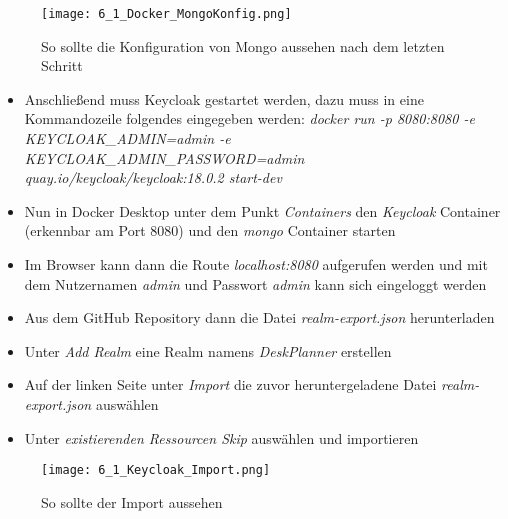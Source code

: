 \begin{figure}[!h]
    \centering
    \texttt{[image: 6\_1\_Docker\_MongoKonfig.png]}
    \caption{So sollte die Konfiguration von Mongo aussehen nach dem letzten Schritt}
    \label{fig:DockerMongoKonfig}
\end{figure}

\begin{itemize}
    \item   Anschließend muss Keycloak gestartet werden, dazu muss in eine Kommandozeile folgendes eingegeben werden: \textit{docker run -p 8080:8080 -e KEYCLOAK\_ADMIN=admin -e KEYCLOAK\_ADMIN\_PASSWORD=admin quay.io/keycloak/keycloak:18.0.2 start-dev}
    \item   Nun in Docker Desktop unter dem Punkt \textit{Containers} den \textit{Keycloak} Container (erkennbar am Port 8080) und den \textit{mongo} Container starten
    \item   Im Browser kann dann die Route \textit{localhost:8080} aufgerufen werden und mit dem Nutzernamen \textit{admin} und Passwort \textit{admin} kann sich eingeloggt werden
    \item   Aus dem GitHub Repository dann die Datei \textit{realm-export.json} herunterladen
    \item   Unter \textit{Add Realm} eine Realm namens \textit{DeskPlanner} erstellen
    \item   Auf der linken Seite unter \textit{Import} die zuvor heruntergeladene Datei \textit{realm-export.json} auswählen
    \item   Unter \textit{existierenden Ressourcen Skip} auswählen und importieren 
\end{itemize}

\begin{figure}[!h]
    \centering
    \texttt{[image: 6\_1\_Keycloak\_Import.png]}
    \caption{So sollte der Import aussehen}
    \label{fig:KeycloakImport}
\end{figure}

